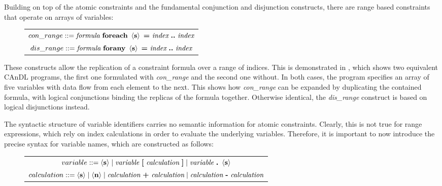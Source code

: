     Building on top of the atomic constraints and the fundamental conjunction
    and disjunction constructs, there are range based constraints that operate
    on arrays of variables:
\begin{figure}[h]
  \centering
  \begin{tabular}{|c|}
    \hline
    $con\_range ::= \text{\it formula}\ \text{\bf foreach}\ \left<\text{\bf s}\right>\ \text{\bf =}\ \text{\it index}\ \text{\bf ..}\ \text{\it index}$\\
    $dis\_range ::= \text{\it formula}\ \text{\bf forany}\ \left<\text{\bf s}\right>\ \text{\bf =}\ \text{\it index}\ \text{\bf ..}\ \text{\it index}$\\
    \hline
  \end{tabular}
\end{figure}

    \noindent
    These constructs allow the replication of a constraint formula over a range
    of indices.
    This is demonstrated in , which shows two equivalent
    CAnDL programs, the first one formulated with {\it con\_range} and the
    second one without.
    In both cases, the program specifies an array of five variables with data
    flow from each element to the next.
    This shows how {\it con\_range} can be expanded by duplicating the contained
    formula, with logical conjunctions binding the replicas of the
    formula together.
    Otherwise identical, the {\it dis\_range} construct is based on logical
    disjunctions instead.

    The syntactic structure of variable identifiers carries no semantic
    information for atomic constraints.
    Clearly, this is not true for range expressions, which rely on index
    calculations in order to evaluate the underlying variables.
    Therefore, it is important to now introduce the precise syntax for variable
    names, which are constructed as follows:

\begin{figure}[h]
  \centering
  \begin{tabular}{|c|}
    \hline
    $variable ::= \left<\text{\bf s}\right>\mid\text{\it variable}\ \text{\bf [}\ \text{\it calculation}\ \text{\bf ]}\mid\text{\it variable}\ \text{\bf.}\ \left<\text{\bf s}\right>$\\
    $calculation ::= \left<\text{\bf s}\right>\mid\left<\text{\bf n}\right>\mid\text{\it calculation}\ \text{\bf+}\ \text{\it calculation}\mid\text{\it calculation}\ \text{\bf-}\ \text{\it calculation}$\\
    \hline
  \end{tabular}
\end{figure}


